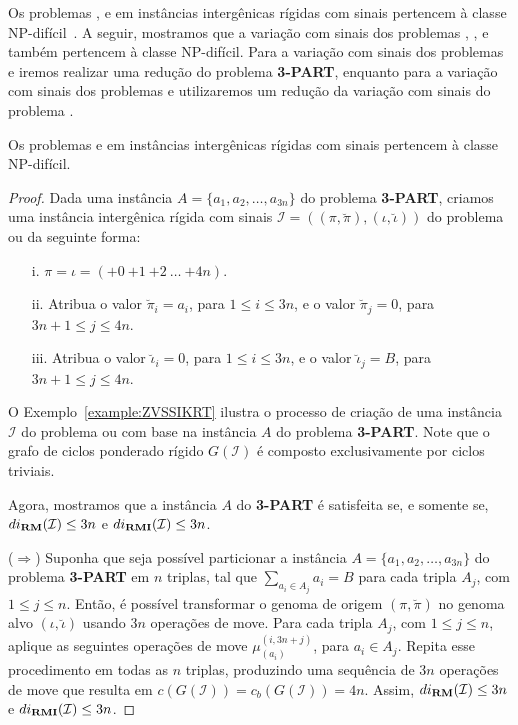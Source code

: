 Os problemas \SbIR{}, \SbIRT{} e \SbIRTM{} em instâncias intergênicas rígidas com sinais pertencem à classe NP-difícil~\cite{2021a-oliveira-etal,2021b-oliveira-etal}. A seguir, mostramos que a variação com sinais dos problemas \SbIRM{}, \SbIRMI{}, \SbIRTI{} e \SbIRTMI{} também pertencem à classe NP-difícil. Para a variação com sinais dos problemas \SbIRM{} e \SbIRMI{} iremos realizar uma redução do problema \textbf{3-PART}, enquanto para a variação com sinais dos problemas \SbIRTI{} e \SbIRTMI{} utilizaremos um redução da variação com sinais do problema \SbRT{}.

\begin{theorem}\label{theorem:FETVDCDT}
Os problemas \SbIRM{} e \SbIRMI{} em instâncias intergênicas rígidas com sinais pertencem à classe NP-difícil.
\end{theorem}
\begin{proof}
Dada uma instância $A=\{a_1,a_2,\dots,a_{3n}\}$ do problema \textbf{3-PART}, criamos uma instância intergênica rígida com sinais $\mathcal{I} = ((\pi,\breve\pi ),(\iota,\breve\iota))$ do problema \SbIRM{} ou \SbIRMI{} da seguinte forma:
\begin{itemize}
    \item[i.] $\pi = \iota = ({+0}~{+1}~{+2}~\dots~{+4n})$.
    \item[ii.] Atribua o valor $\breve\pi_i = a_i$, para $1 \le i \le 3n$, e o valor $\breve\pi_j = 0$, para $3n+1 \le j \le 4n$.
    \item[iii.] Atribua o valor $\breve\iota_i = 0$, para $1 \le i \le 3n$, e o valor $\breve\iota_j = B$, para $3n+1 \le j \le 4n$.
\end{itemize}

O Exemplo~\ref{example:ZVSSIKRT} ilustra o processo de criação de uma instância $\mathcal{I}$ do problema \SbIRM{} ou \SbIRMI{} com base na instância $A$ do problema \textbf{3-PART}. Note que o grafo de ciclos ponderado rígido $G(\mathcal{I})$ é composto exclusivamente por ciclos triviais.



Agora, mostramos que a instância $A$ do \textbf{3-PART} é satisfeita se, e somente se, \break$di_{\textbf{RM}}(\mathcal{I}) \le 3n$ e $di_{\textbf{RMI}}(\mathcal{I}) \le 3n$.

($\Rightarrow$) Suponha que seja possível particionar a instância $A=\{a_1,a_2,\dots,a_{3n}\}$ do problema \textbf{3-PART} em $n$ triplas, tal que $\sum_{a_i \in A_j} a_i = B$ para cada tripla $A_j$, com $1\le j \le n$. Então, é possível transformar o genoma de origem $(\pi, \breve\pi)$ no genoma alvo $(\iota, \breve\iota)$ usando $3n$ operações de move. Para cada tripla $A_j$, com $1\le j \le n$, aplique as seguintes operações de move $\mu_{(a_i)}^{(i,3n+j)}$, para $a_i \in A_j$. Repita esse procedimento em todas as $n$ triplas, produzindo uma sequência de $3n$ operações de move que resulta em $c(G(\mathcal{I})) = c_b(G(\mathcal{I})) = 4n$. Assim, $di_{\textbf{RM}}(\mathcal{I}) \le 3n$ e $di_{\textbf{RMI}}(\mathcal{I}) \le 3n$.


\end{proof}
